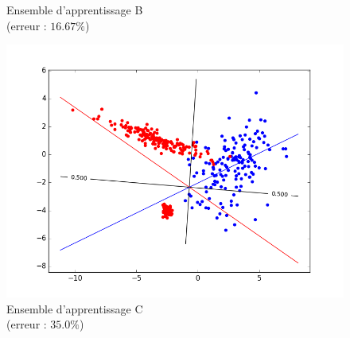 \documentclass[paper=a4, fontsize=11pt]{article}
\begin{document}
\begin{figure}[h]
\begin{minipage}[b]{.3\linewidth}
  \caption*{Ensemble d'apprentissage B \\ (erreur : $16.67\%$)}
 \end{minipage} \hfill
 \begin{minipage}[b]{.3\linewidth}
  \includegraphics[scale=0.25]{figures/lin_reg_C_train.png}
  \caption*{Ensemble d'apprentissage C \\ (erreur : $35.0\%$)}
 \end{minipage}
\end{figure}
\end{document}
